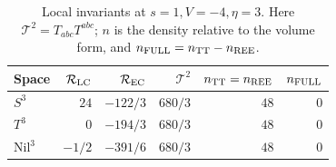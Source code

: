 \begin{table}[htbp]
\centering
\small
\caption{Local invariants at $s=1,V=-4,\eta=3$. Here $\mathcal T^2=T_{abc}T^{abc}$; $n$ is the density relative to the volume form, and $n_{\rm FULL}=n_{\rm TT}-n_{\rm REE}$.}\label{tab:v3:5}
\setlength{\tabcolsep}{4pt}
\renewcommand{\arraystretch}{1.25}
\begin{tabular}{lrrrrr}
\toprule
Space & $\mathcal R_{\rm LC}$ & $\mathcal R_{\rm EC}$ & $\mathcal T^2$ & $n_{\rm TT}=n_{\rm REE}$ & $n_{\rm FULL}$ \\
\midrule
$S^3$ & $24$ & $-122/3$ & $680/3$ & $48$ & $0$ \\
$T^3$ & $0$ & $-194/3$ & $680/3$ & $48$ & $0$ \\
$\mathrm{Nil}^3$ & $-1/2$ & $-391/6$ & $680/3$ & $48$ & $0$ \\
\bottomrule
\end{tabular}
\end{table}
